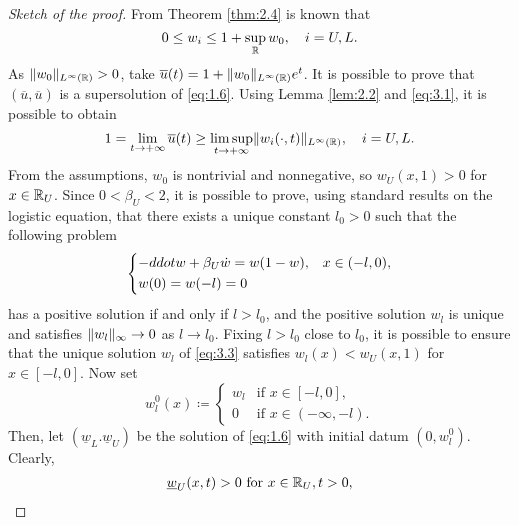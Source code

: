 \begin{proof}[Sketch of the proof]
    From Theorem \ref{thm:2.4} is known that 
    \begin{equation}
        0 \leq w_{i} \leq 1 + \sup_{\mathbb{R}} w_{0}, \quad i = U, L.
        \label{eq:3.1}
    \end{equation}
    As \(\lVert w_{0}\rVert_{L^{\infty}(\mathbb{R})} > 0\), take \(\overline{u}(t) = 1 + \lVert w_{0}\rVert_{L^{\infty}(\mathbb{R})}e^{t}\). 
    It is possible to prove that \((\overline{u}, \overline{u})\) is a supersolution of \eqref{eq:1.6}. Using Lemma \ref{lem:2.2} and \eqref{eq:3.1}, it is possible to obtain 
    \begin{equation}
        1 = \lim_{t \to +\infty} \overline{u}(t) \geq \limsup_{t \to +\infty} \lVert w_i(\cdot, t)\rVert_{L^{\infty}(\mathbb{R})}, \quad i = U, L.
        \label{eq:3.2}
    \end{equation}
    From the assumptions, \(w_0\) is nontrivial and nonnegative, so \(w_U(x, 1) > 0\) for \(x \in \mathbb{R}_U\). Since \(0 < \beta_U < 2\), it is possible to prove, using standard results on the logistic equation, that there exists a unique constant \(l_0 > 0\) such that the following problem
    \begin{equation}
        \begin{dcases}
            -ddot{w} + \beta_U \dot{w} = w(1 - w), & x \in (-l, 0), \\
            w(0) = w(-l) = 0
        \end{dcases}
        \label{eq:3.3}
    \end{equation}
    has a positive solution if and only if \(l > l_0\), and the positive solution \(w_l\) is unique and satisfies \(\lVert w_l\rVert_\infty \to 0\) as \(l \to l_0\). Fixing \(l > l_0\) close to \(l_0\), it is possible to ensure that the unique solution \(w_l\) of \eqref{eq:3.3} satisfies \(w_l(x) < w_U(x, 1)\) for \(x \in [-l, 0]\). Now set 
    \begin{equation*}
        w_l^0(x) \coloneqq \begin{cases}
            w_l & \text{if } x \in [-l, 0], \\
            0 & \text{if } x \in (-\infty, -l).
        \end{cases}
    \end{equation*}
    Then, let \((\underline{w}_L. \underline{w}_U)\) be the solution of \eqref{eq:1.6} with initial datum \((0, w_l^0)\). Clearly,
    \begin{align*}
        \underline{w}_U(x, t) > 0 & \text{ for } x \in \real_U, t > 0, \\

\end{align*}
\end{proof}
